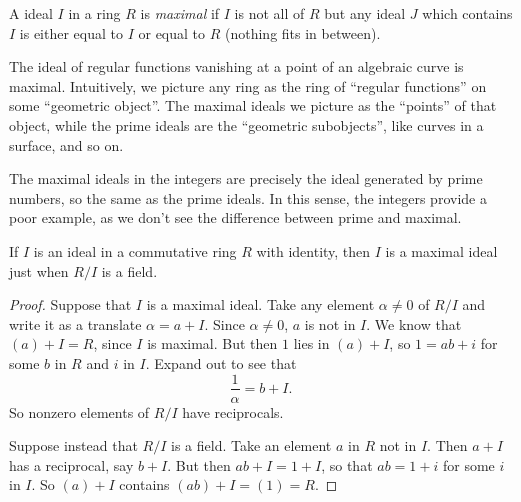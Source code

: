 A ideal \(I\) in a ring \(R\) is \emph{maximal} if \(I\) is not all of \(R\) but any ideal \(J\) which contains \(I\) is either equal to \(I\) or equal to \(R\) (nothing fits in between).
\begin{example}
The ideal of regular functions vanishing at a point of an algebraic curve is maximal.
Intuitively, we picture any ring as the ring of ``regular functions'' on some ``geometric object''.
The maximal ideals we picture as the ``points'' of that object, while the prime ideals are the ``geometric subobjects'', like curves in a surface, and so on.
\end{example}
\begin{example}
The maximal ideals in the integers are precisely the ideal generated by prime numbers, so the same as the prime ideals.
In this sense, the integers provide a poor example, as we don't see the difference between prime and maximal.
\end{example}
\begin{lemma}
If \(I\) is an ideal in a commutative ring \(R\) with identity, then \(I\) is a maximal ideal just when \(R/I\) is a field.
\end{lemma}
\begin{proof}
Suppose that \(I\) is a maximal ideal.
Take any element \(\alpha \ne 0\) of \(R/I\) and write it as a translate \(\alpha=a+I\).
Since \(\alpha \ne 0\), \(a\) is not in \(I\).
We know that \((a)+I=R\), since \(I\) is maximal.
But then \(1\) lies in \((a)+I\), so \(1=ab+i\) for some \(b\) in \(R\) and \(i\) in \(I\).
Expand out to see that 
\[
\frac{1}{\alpha}=b+I.
\]
So nonzero elements of \(R/I\) have reciprocals.

Suppose instead that \(R/I\) is a field.
Take an element \(a\) in \(R\) not in \(I\).
Then \(a+I\) has a reciprocal, say \(b+I\).
But then \(ab+I=1+I\), so that \(ab=1+i\) for some \(i\) in \(I\).
So \((a)+I\) contains \((ab)+I=(1)=R\). 
\end{proof}

